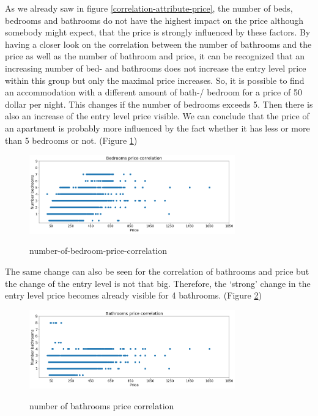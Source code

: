 As we already saw in figure \ref{correlation-attribute-price}, the number of beds, bedrooms and bathrooms do not have the highest impact on the price although somebody might expect, that the price is strongly influenced by these factors. By having a closer look on the correlation between the number of bathrooms and the price as well as the number of bathroom and price, it can be recognized that an increasing number of bed- and bathrooms does not increase the entry level price within this group but only the maximal price increases. So, it is possible to find an accommodation with a different amount of bath-/ bedroom for a price of 50 dollar per night. This changes if the number of bedrooms exceeds 5. Then there is also an increase of the entry level price visible. We can conclude that the price of an apartment is probably more influenced by the fact whether it has less or more than 5 bedrooms or not. (Figure \ref{bedroom-price-correlation})
\begin{figure}
  \begin{center}
  \includegraphics[width=3.5in]{photo/10_bedrooms_price_correlation.png}\\
  \caption{number-of-bedroom-price-correlation}\label{bedroom-price-correlation}
  \end{center}
\end{figure}
The same change can also be seen for the correlation of bathrooms and price but the change of the entry level is not that big. Therefore, the ‘strong’ change in the entry level price becomes already visible for 4 bathrooms. (Figure \ref{bathrooms-price-correlation})
\begin{figure}
  \begin{center}
  \includegraphics[width=3.5in]{photo/9_bathroom_price_correlation.png}\\
  \caption{number of bathrooms price correlation}\label{bathrooms-price-correlation}
  \end{center}
\end{figure}


